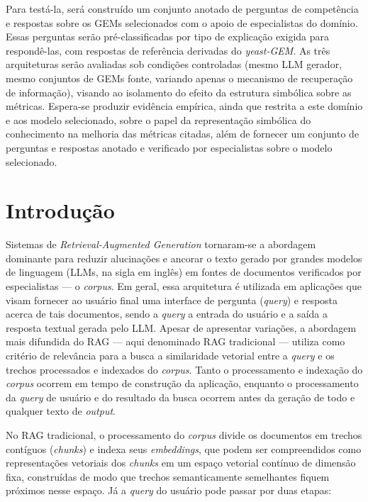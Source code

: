 \documentclass{article}
\begin{document}
Para testá-la, será construído um conjunto anotado de perguntas de competência e respostas sobre os GEMs selecionados com o apoio de especialistas do domínio. Essas perguntas serão pré-classificadas por tipo de explicação exigida para respondê-las, com respostas de referência derivadas do  \textit{yeast-GEM}. As três arquiteturas serão avaliadas sob condições controladas (mesmo LLM gerador, mesmo conjuntos de GEMs fonte, variando apenas o mecanismo de recuperação de informação), visando ao isolamento do efeito da estrutura simbólica sobre as métricas. Espera-se produzir evidência empírica, ainda que restrita a este domínio e aos modelo selecionado, sobre o papel da representação simbólica do conhecimento na melhoria das métricas citadas, além de fornecer um conjunto de perguntas e respostas anotado e verificado por especialistas sobre o modelo selecionado.

\newpage

\section{Introdução}

Sistemas de \textit{Retrieval-Augmented Generation} \cite{lewis2020retrieval} tornaram-se a abordagem dominante para reduzir alucinações e ancorar o texto gerado por grandes modelos de linguagem (LLMs, na sigla em inglês) em fontes de documentos verificados por especialistas --- o \textit{corpus}. Em geral, essa arquitetura é utilizada em aplicações que visam fornecer ao usuário final uma interface de pergunta (\textit{query}) e resposta acerca de tais documentos, sendo a \textit{query} a entrada do usuário e a saída a resposta textual gerada pelo LLM. Apesar de apresentar variações, a abordagem mais difundida do RAG --- aqui denominado RAG tradicional --- utiliza como critério de relevância para a busca a similaridade vetorial entre a \textit{query} e os trechos processados e indexados do \textit{corpus}. Tanto o processamento e indexação do \textit{corpus} ocorrem em tempo de construção da aplicação, enquanto o processamento da \textit{query} de usuário e do resultado da busca ocorrem antes da geração de todo e qualquer texto de \textit{output}.

No RAG tradicional, o processamento do \textit{corpus} divide os documentos em trechos contíguos (\textit{chunks}) e indexa seus \textit{embeddings}, que podem ser compreendidos como representações vetoriais dos \textit{chunks} em um espaço vetorial contínuo de dimensão fixa, construídas de modo que trechos semanticamente semelhantes fiquem próximos nesse espaço.
Já a \textit{query} do usuário pode passar por duas etapas:
\end{document}
